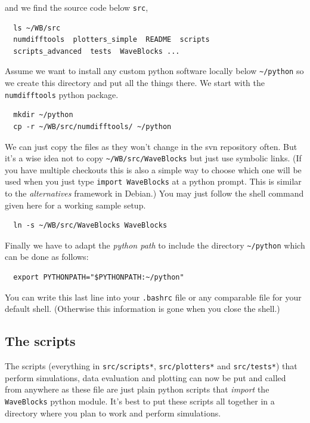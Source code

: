 \documentclass[a4paper,10pt]{report}
\begin{document}
and we find the source code below \texttt{src},

\begin{verbatim}
  ls ~/WB/src
  numdifftools  plotters_simple  README  scripts
  scripts_advanced  tests  WaveBlocks ...
\end{verbatim}

Assume we want to install any custom python software locally below \verb|~/python|
so we create this directory and put all the things there. We start
with the \texttt{numdifftools} python package.

\begin{verbatim}
  mkdir ~/python
  cp -r ~/WB/src/numdifftools/ ~/python
\end{verbatim}

We can just copy the files as they won't change in the svn repository
often. But it's a wise idea not to copy \verb|~/WB/src/WaveBlocks| but
just use symbolic links. (If you have multiple checkouts this is also a simple
way to choose which one will be used when you just type \texttt{import WaveBlocks}
at a python prompt. This is similar to the \emph{alternatives} framework in Debian.)
You may just follow the shell command given here for a working sample setup.

\begin{verbatim}
  ln -s ~/WB/src/WaveBlocks WaveBlocks
\end{verbatim}

Finally we have to adapt the \emph{python path} to include the directory
\verb|~/python| which can be done as follows:

\begin{verbatim}
  export PYTHONPATH="$PYTHONPATH:~/python"
\end{verbatim}

You can write this last line into your \texttt{.bashrc} file or any comparable file
for your default shell. (Otherwise this information is gone when you close the
shell.)

\subsection*{The scripts}

The scripts (everything in \texttt{src/scripts*}, \texttt{src/plotters*} and \texttt{src/tests*})
that perform simulations, data evaluation and plotting can now be put and called
from anywhere as these file are just plain python scripts that \emph{import} the
\texttt{WaveBlocks} python module. It's best to put these scripts all together
in a directory where you plan to work and perform simulations.
\end{document}
